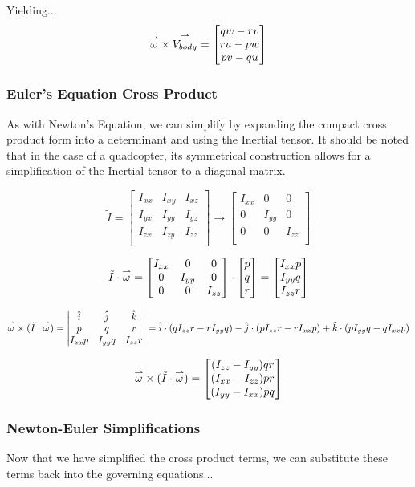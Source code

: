 Yielding... 
$$\overset{\rightharpoonup}{\omega} \times \overset{\rightharpoonup}{V_{body}} = \begin{bmatrix} q w - r v \\ r u -p w \\ p v - q u \end{bmatrix}$$

\subsubsection{Euler's Equation Cross Product}
As with Newton's Equation, we can simplify by expanding the compact cross product form into a determinant and using the Inertial tensor. It should be noted that in the case of a quadcopter, its symmetrical construction allows for a simplification of the Inertial tensor to a diagonal matrix. 

$$\tilde{I} = \begin{bmatrix}
    I_{xx} & I_{xy} & I_{xz} \\
    I_{yx} & I_{yy} & I_{yz} \\
    I_{zx} & I_{zy} & I_{zz} \\
\end{bmatrix} \rightarrow \begin{bmatrix}
    I_{xx} & 0 & 0 \\
    0 & I_{yy} & 0 \\
    0 & 0 & I_{zz} \\
\end{bmatrix}$$


$$\tilde{I} \cdot \overset{\rightharpoonup}{\omega} = \begin{bmatrix}
    I_{xx} & 0 & 0 \\
    0 & I_{yy} & 0 \\
    0 & 0 & I_{zz} \\
\end{bmatrix} \cdot \begin{bmatrix} p \\ q \\ r \end{bmatrix} = \begin{bmatrix} I_{xx}p \\ I_{yy}q \\ I_{zz}r \end{bmatrix}$$

$$\overset{\rightharpoonup}{\omega} \times (\tilde{I}\cdot \overset{\rightharpoonup}{\omega}) = \begin{vmatrix}
    \hat{i} & \hat{j} & \hat{k}\\ 
    p & q & r\\
    I_{xx}p & I_{yy}q & I_{zz}r
\end{vmatrix} = \hat{i} \cdot (q I_{zz}r - r I_{yy}q) - \hat{j} \cdot (p I_{zz}r - r I_{xx}p) +\hat{k} \cdot (p I_{yy}q - q I_{xx}p) $$

$$ \overset{\rightharpoonup}{\omega} \times (\tilde{I}\cdot \overset{\rightharpoonup}{\omega})= \begin{bmatrix} (I_{zz} - I_{yy})qr \\ (I_{xx} - I_{zz})pr \\ (I_{yy}- I_{xx})pq \end{bmatrix}$$



\subsubsection{Newton-Euler Simplifications}
Now that we have simplified the cross product terms, we can substitute these terms back into the governing equations... 

